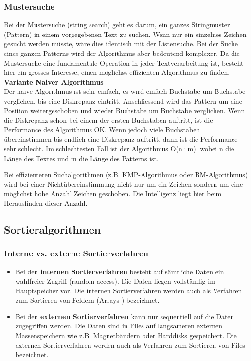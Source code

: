 \subsubsection{Mustersuche}
Bei der Mustersuche (string search) geht es darum, ein ganzes Stringmuster (Pattern) in einem vorgegebenen Text zu suchen. Wenn nur ein einzelnes Zeichen gesucht werden müsste, wäre dies identisch mit der Listensuche. Bei der Suche eines ganzen Patterns wird der Algorithmus aber bedeutend komplexer. Da die Mustersuche eine fundamentale Operation in jeder Textverarbeitung ist, besteht hier ein grosses Interesse, einen möglichst effizienten Algorithmus zu finden.\\

\textbf{Variante Naiver Algorithmus}\\
Der naive Algorithmus ist sehr einfach, es wird einfach Buchstabe um Buchstabe verglichen, bis eine Diskrepanz eintritt. Anschliessend wird das Pattern um eine Position weitergeschoben und wieder
Buchstabe um Buchstabe verglichen. Wenn die Diskrepanz schon bei einem der ersten Buchstaben auftritt, ist die Performance des Algorithmus OK. Wenn jedoch viele Buchstaben übereinstimmen bis endlich eine Diskrepanz auftritt, dann ist die Performance sehr schlecht. Im schlechtesten Fall ist der Algorithmus O(n·m), wobei n die Länge des Textes und m die Länge des Patterns ist.

Bei effizienteren Suchalgorithmen (z.B. KMP-Algorithmus oder BM-Algorithmus) wird bei einer Nichtübereinstimmung nicht nur um ein Zeichen sondern um eine möglichst hohe Anzahl Zeichen geschoben. Die Intelligenz liegt hier beim Herausfinden dieser Anzahl.\\


\subsection{Sortieralgorithmen}

\subsubsection{Interne vs. externe Sortierverfahren}
\begin{itemize}
    \item Bei den \textbf{internen Sortierverfahren} besteht auf sämtliche Daten ein wahlfreier Zugriff (random access). Die Daten liegen vollständig im Hauptspeicher vor. Die internen Sortierverfahren werden auch als Verfahren zum Sortieren von Feldern (Arrays ) bezeichnet.
    \item Bei den \textbf{externen Sortierverfahren} kann nur sequentiell auf die Daten zugegriffen werden. Die Daten sind in Files auf langsameren externen Massenspeichern wie z.B. Magnetbändern oder Harddisks gespeichert. Die externen Sortierverfahren werden auch als Verfahren zum Sortieren von Files bezeichnet.
\end{itemize}

